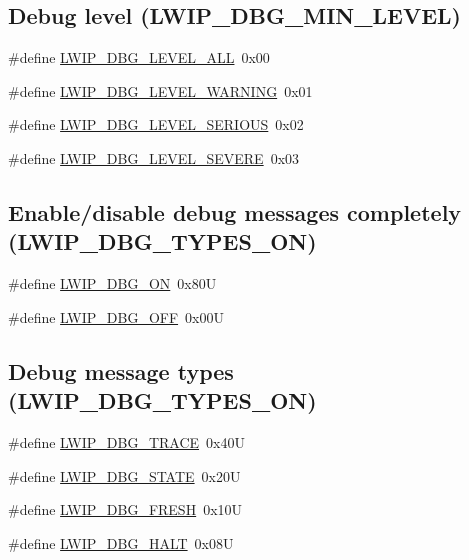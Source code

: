 \subsection*{Debug level (L\+W\+I\+P\+\_\+\+D\+B\+G\+\_\+\+M\+I\+N\+\_\+\+L\+E\+V\+EL)}
\begin{DoxyCompactItemize}
\item 
\#define \hyperlink{group__debugging__levels_ga8ebaeb006b43f55897f3196b3617dc87}{L\+W\+I\+P\+\_\+\+D\+B\+G\+\_\+\+L\+E\+V\+E\+L\+\_\+\+A\+LL}~0x00
\item 
\#define \hyperlink{group__debugging__levels_ga77c491e468bf7d9a1bc48430c1866a96}{L\+W\+I\+P\+\_\+\+D\+B\+G\+\_\+\+L\+E\+V\+E\+L\+\_\+\+W\+A\+R\+N\+I\+NG}~0x01
\item 
\#define \hyperlink{group__debugging__levels_ga0269bdc51f1e8a5ecf9af72c6e1c996c}{L\+W\+I\+P\+\_\+\+D\+B\+G\+\_\+\+L\+E\+V\+E\+L\+\_\+\+S\+E\+R\+I\+O\+US}~0x02
\item 
\#define \hyperlink{group__debugging__levels_gaab41143277cd38047b6660d90e9cec3b}{L\+W\+I\+P\+\_\+\+D\+B\+G\+\_\+\+L\+E\+V\+E\+L\+\_\+\+S\+E\+V\+E\+RE}~0x03
\end{DoxyCompactItemize}
\subsection*{Enable/disable debug messages completely (L\+W\+I\+P\+\_\+\+D\+B\+G\+\_\+\+T\+Y\+P\+E\+S\+\_\+\+ON)}
\begin{DoxyCompactItemize}
\item 
\#define \hyperlink{group__debugging__levels_ga9e31b7cbbc8f46af8e62b548079acd4e}{L\+W\+I\+P\+\_\+\+D\+B\+G\+\_\+\+ON}~0x80U
\item 
\#define \hyperlink{group__debugging__levels_gadab1cdc3f45939a3a5c9a3d7e04987e1}{L\+W\+I\+P\+\_\+\+D\+B\+G\+\_\+\+O\+FF}~0x00U
\end{DoxyCompactItemize}
\subsection*{Debug message types (L\+W\+I\+P\+\_\+\+D\+B\+G\+\_\+\+T\+Y\+P\+E\+S\+\_\+\+ON)}
\begin{DoxyCompactItemize}
\item 
\#define \hyperlink{group__debugging__levels_ga988147559b78642ac881815b66023646}{L\+W\+I\+P\+\_\+\+D\+B\+G\+\_\+\+T\+R\+A\+CE}~0x40U
\item 
\#define \hyperlink{group__debugging__levels_ga511ee3deb3240635f5ec6a1709c6d741}{L\+W\+I\+P\+\_\+\+D\+B\+G\+\_\+\+S\+T\+A\+TE}~0x20U
\item 
\#define \hyperlink{group__debugging__levels_ga7d44d1804fa5e747aed86816e2a6cae0}{L\+W\+I\+P\+\_\+\+D\+B\+G\+\_\+\+F\+R\+E\+SH}~0x10U
\item 
\#define \hyperlink{group__debugging__levels_gab0a296414983155b30ad51871606b90f}{L\+W\+I\+P\+\_\+\+D\+B\+G\+\_\+\+H\+A\+LT}~0x08U
\end{DoxyCompactItemize}
